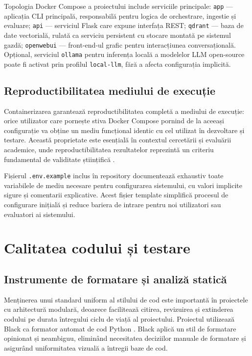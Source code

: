 \documentclass[12pt, a4paper, oneside, romanian]{teza-upb}
\begin{document}
Topologia Docker Compose a proiectului include serviciile principale: \texttt{app} — aplicația CLI principală, responsabilă pentru logica de orchestrare, ingestie și evaluare; \texttt{api} — serviciul Flask care expune interfața REST; \texttt{qdrant} — baza de date vectorială, rulată ca serviciu persistent cu stocare montată pe sistemul gazdă; \texttt{openwebui} — front-end-ul grafic pentru interacțiunea conversațională. Opțional, serviciul \texttt{ollama} pentru inferența locală a modelelor LLM open-source poate fi activat prin profilul \texttt{local-llm}, fără a afecta configurația implicită.

\subsection{Reproductibilitatea mediului de execuție}

Containerizarea garantează reproductibilitatea completă a mediului de execuție: orice utilizator care pornește stiva Docker Compose pornind de la aceeași configurație va obține un mediu funcțional identic cu cel utilizat în dezvoltare și testare. Această proprietate este esențială în contextul cercetării și evaluării academice, unde reproductibilitatea rezultatelor reprezintă un criteriu fundamental de validitate științifică \cite{goodfellow2016}.

Fișierul \texttt{.env.example} inclus în repository documentează exhaustiv toate variabilele de mediu necesare pentru configurarea sistemului, cu valori implicite sigure și comentarii explicative. Acest fișier template simplifică procesul de configurare inițială și reduce bariera de intrare pentru noi utilizatori sau evaluatori ai sistemului.

\section{Calitatea codului și testare}

\subsection{Instrumente de formatare și analiză statică}

Menținerea unui standard uniform al stilului de cod este importantă în proiectele cu arhitectură modulară, deoarece facilitează citirea, revizuirea și extinderea codului pe durata întregului ciclu de viață al proiectului. Proiectul utilizează Black ca formator automat de cod Python \cite{black_doc}. Black aplică un stil de formatare opinionat și neambiguu, eliminând necesitatea deciziilor manuale de formatare și asigurând uniformitatea vizuală a întregii baze de cod.
\end{document}

